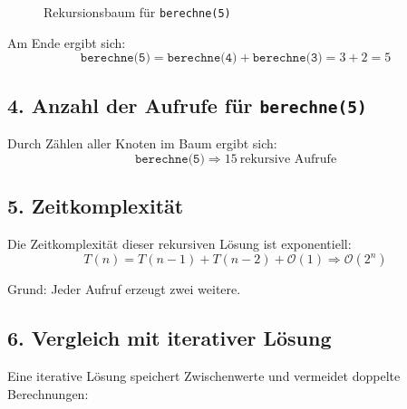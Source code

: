 \documentclass[a4paper,12pt]{article}
\begin{document}
\begin{figure}[H]
	\centering
	\caption{Rekursionsbaum für \texttt{berechne(5)}}
\end{figure}

		
		Am Ende ergibt sich:
		\[
		\texttt{berechne(5)} = \texttt{berechne(4)} + \texttt{berechne(3)} = 3 + 2 = 5
		\]
		
		\subsection*{4. Anzahl der Aufrufe für \texttt{berechne(5)}}
		
		Durch Zählen aller Knoten im Baum ergibt sich:
		\[
		\texttt{berechne(5)} \Rightarrow 15~\text{rekursive Aufrufe}
		\]
		
		\subsection*{5. Zeitkomplexität}
		
		Die Zeitkomplexität dieser rekursiven Lösung ist exponentiell:
		\[
		T(n) = T(n-1) + T(n-2) + \mathcal{O}(1) \Rightarrow \mathcal{O}(2^n)
		\]
		
		Grund: Jeder Aufruf erzeugt zwei weitere.
		
		\subsection*{6. Vergleich mit iterativer Lösung}
		
		Eine iterative Lösung speichert Zwischenwerte und vermeidet doppelte Berechnungen:
		
\end{document}
